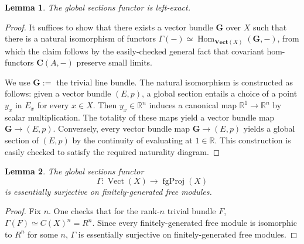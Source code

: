 \documentclass[11pt]{article}
\newcommand{\Hom}{\operatorname{Hom}}
\newcommand{\Vect}{\operatorname{Vect}}
\newcommand{\fgProj}{\operatorname{fgProj}}
\newcommand{\mbf}{\mathbf}
\theoremstyle{plain}
\newtheorem{lemma}{Lemma}[section]
\theoremstyle{definition}
\begin{document}
\begin{lemma}\label{lemma:global-sections-left-exact}
  The global sections functor is left-exact.
\end{lemma}

\begin{proof}
  It suffices to show that there exists a vector bundle \(\mathbf{G}\) over \(X\) such that there is a natural isomorphism of functors \(\Gamma(-) \simeq \Hom_{\mathbf{Vect}(X)}(\mathbf{G}, -) \), from which the claim follows by the easily-checked general fact that covariant hom-functors $\mbf{C}(A, -)$ preserve small limits.

  We use \(\mathbf{G} :=\) the trivial line bundle. The natural isomorphism is constructed as follows: given a vector bundle \((E,p)\), a global section entails a choice of a point \(y_x\) in \(E_x\) for every \(x \in X\). Then \(y_x \in \mathbb{R}^n\) induces a canonical map \(\mathbb{R}^1 \to \mathbb{R}^n\) by scalar multiplication. The totality of these maps yield a vector bundle map \(\mathbf{G} \to (E,p)\). Conversely, every vector bundle map \(\mathbf{G} \to (E,p)\) yields a global section of \((E,p)\) by the continuity of evaluating at \(1 \in \mathbb{R}\). This construction is easily checked to satisfy the required naturality diagram.
\end{proof}

\begin{lemma}\label{lemma:global-sections-essentially-surjective-aux}
  The global sections functor
    \[\Gamma : \Vect(X) \longrightarrow \fgProj(X)\]
  is essentially surjective on finitely-generated free modules.
\end{lemma}

\begin{proof}
  Fix \(n\). One checks that for the rank-\(n\) trivial bundle \(F\), \(\Gamma(F) \simeq C(X)^n = R^n\). Since every finitely-generated free module is isomorphic to \(R^n\) for some \(n\), \(\Gamma\) is essentially surjective on finitely-generated free modules.
\end{proof}
\end{document}
